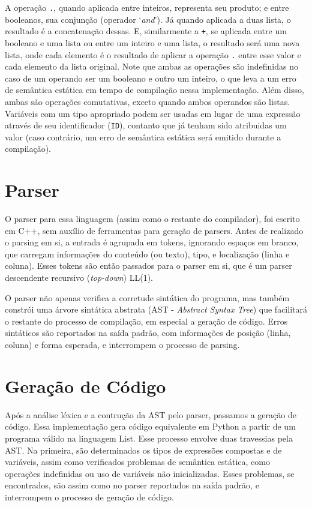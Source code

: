 \documentclass{article}
\begin{document}
A operação \texttt{.}, quando aplicada entre inteiros, representa seu produto; e entre booleanos, sua conjunção (operador `\textit{and}'). Já quando aplicada a duas lista, o resultado é a concatenação dessas. E, similarmente a \texttt{+}, se aplicada entre um booleano e uma lista ou entre um inteiro e uma lista, o resultado será uma nova lista, onde cada elemento é o resultado de aplicar a operação \texttt{.} entre esse valor e cada elemento da lista original. Note que ambas as operações são indefinidas no caso de um operando ser um booleano e outro um inteiro, o que leva a um erro de semântica estática em tempo de compilação nessa implementação. Além disso, ambas são operações comutativas, exceto quando ambos operandos são listas. Variáveis com um tipo apropriado podem ser usadas em lugar de uma expressão através de seu identificador (\texttt{ID}), contanto que já tenham sido atribuidas um valor (caso contrário, um erro de semântica estática será emitido durante a compilação). 


\section{Parser}
\label{sec:parser}
O parser para essa linguagem (assim como o restante do compilador), foi escrito em C++, sem auxílio de ferramentas para geração de parsers. Antes de realizado o parsing em si, a entrada é agrupada em tokens, ignorando espaços em branco, que carregam informações do conteúdo (ou texto), tipo, e localização (linha e coluna). Esses tokens são então passados para o parser em si, que é um parser descendente recursivo (\textit{top-down}) LL(1). 

O parser não apenas verifica a corretude sintática do programa, mas também constrói uma árvore sintática abstrata (AST - \textit{Abstract Syntax Tree}) que facilitará o restante do processo de compilação, em especial a geração de código. Erros sintáticos são reportados na saída padrão, com informações de posição (linha, coluna) e forma esperada, e interrompem o processo de parsing.

\section{Geração de Código}
\label{sec:geracao}
Após a análise léxica e a contrução da AST pelo parser, passamos a geração de código. Essa implementação gera código equivalente em Python a partir de um programa válido na linguagem List. Esse processo envolve duas travessias pela AST. Na primeira, são determinados os tipos de expressões compostas e de variáveis, assim como verificados problemas de semântica estática, como operações indefinidas ou uso de variáveis não inicializadas. Esses problemas, se encontrados, são assim como no parser reportados na saída padrão, e interrompem o processo de geração de código.
\end{document}
